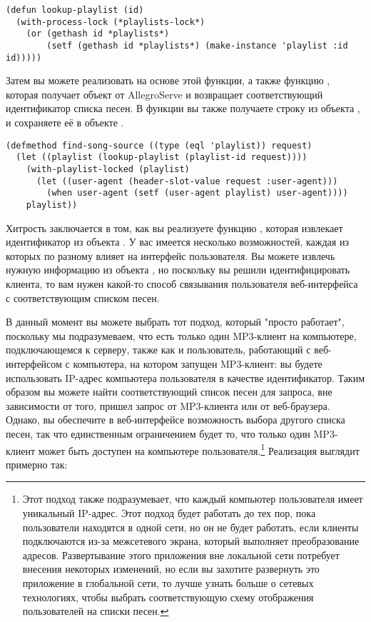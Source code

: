 \begin{lstlisting}
(defun lookup-playlist (id)
  (with-process-lock (*playlists-lock*)
    (or (gethash id *playlists*)
        (setf (gethash id *playlists*) (make-instance 'playlist :id id)))))
\end{lstlisting}

Затем вы можете реализовать  на основе этой функции, а также
функцию , которая получает объект  от AllegroServe и
возвращает соответствующий идентификатор списка песен.  В функции 
вы также получаете строку  из объекта , и сохраняете её в
объекте .

\begin{lstlisting}
(defmethod find-song-source ((type (eql 'playlist)) request)
  (let ((playlist (lookup-playlist (playlist-id request))))
    (with-playlist-locked (playlist)
      (let ((user-agent (header-slot-value request :user-agent)))
        (when user-agent (setf (user-agent playlist) user-agent))))
    playlist))
\end{lstlisting}

Хитрость заключается в том, как вы реализуете функцию , которая
извлекает идентификатор из объекта .  У вас имеется несколько возможностей,
каждая из которых по разному влияет на интерфейс пользователя.  Вы можете извлечь нужную
информацию из объекта , но поскольку вы решили идентифицировать клиента, то
вам нужен какой-то способ связывания пользователя веб-интерфейса с соответствующим списком
песен.

В данный момент вы можете выбрать тот подход, который "просто работает", поскольку мы
подразумеваем, что есть только один MP3-клиент на компьютере, подключающемся к серверу,
также как и пользователь, работающий с веб-интерфейсом с компьютера, на котором запущен
MP3-клиент: вы будете использовать IP-адрес компьютера пользователя в качестве
идентификатор.  Таким образом вы можете найти соответствующий список песен для запроса,
вне зависимости от того, пришел запрос от MP3-клиента или от веб-браузера.  Однако, вы
обеспечите в веб-интерфейсе возможность выбора другого списка песен, так что единственным
ограничением будет то, что только один MP3-клиент может быть доступен на компьютере
пользователя.\footnote{Этот подход также подразумевает, что каждый компьютер пользователя
  имеет уникальный IP-адрес.  Этот подход будет работать до тех пор, пока пользователи
  находятся в одной сети, но он не будет работать, если клиенты подключаются из-за
  межсетевого экрана, который выполняет преобразование адресов.  Развертывание этого
  приложения вне локальной сети потребует внесения некоторых изменений, но если вы
  захотите развернуть это приложение в глобальной сети, то лучше узнать больше о сетевых
  технологиях, чтобы выбрать соответствующую схему отображения пользователей на списки
  песен.}  Реализация  выглядит примерно так:

